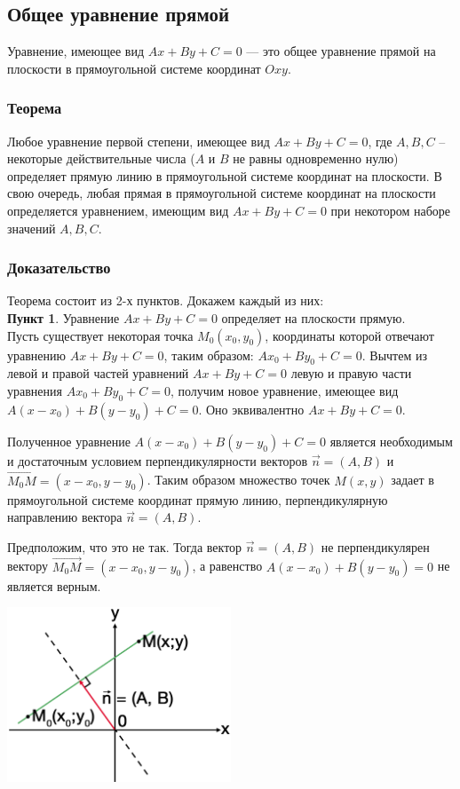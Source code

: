 \documentclass[a4paper,12pt]{extbook}
\theoremstyle{named}
\theoremstyle{named}
\begin{document}
\subsection*{Общее уравнение прямой}

Уравнение, имеющее вид \(Ax + By + C = 0\) — это общее уравнение прямой на плоскости в прямоугольной системе координат \(Oxy\).

\subsubsection*{Теорема}
Любое уравнение первой степени, имеющее вид \(Ax + By + C = 0\), где \(A, B, C\) – некоторые действительные числа (\(A\) и \(B\) не равны одновременно нулю) определяет прямую линию в прямоугольной системе координат на плоскости.
В свою очередь, любая прямая в прямоугольной системе координат на плоскости определяется уравнением, имеющим вид \(Ax + By + C = 0\) при некотором наборе значений \(A, B, C\).
\subsubsection*{Доказательство}
Теорема состоит из 2-х пунктов.
Докажем каждый из них: \\

\textbf{Пункт 1}. Уравнение \(Ax + By + C = 0\) определяет на плоскости прямую. \\

Пусть существует некоторая точка \(M_0(x_0, y_0)\), координаты которой отвечают уравнению \(Ax + By + C = 0\), таким образом: \(Ax_0 + By_0 + C = 0\).
Вычтем из левой и правой частей уравнений \(Ax + By + C = 0\) левую и правую части уравнения \(Ax_0 + By_0 + C = 0\), получим новое уравнение, имеющее вид \(A(x - x_0) + B(y - y_0) + C = 0\).
Оно эквивалентно \(Ax + By + C = 0\).

Полученное уравнение \(A(x - x_0) + B(y - y_0) + C = 0\) является необходимым и достаточным условием перпендикулярности векторов \(\overrightarrow{n} = (A, B)\) и \(\overrightarrow{M_0M} = (x - x_0, y - y_0)\).
Таким образом множество точек \(M(x, y)\) задает в прямоугольной системе координат прямую линию, перпендикулярную направлению вектора \(\overrightarrow{n} = (A, B)\).

Предположим, что это не так. Тогда вектор \(\overrightarrow{n} = (A, B)\) не перпендикулярен вектору \(\overrightarrow{M_0M} = (x - x_0, y - y_0)\), а равенство \(A(x - x_0) + B(y - y_0) = 0\) не является верным.

\begin{center}
    \includegraphics[width=0.5\textwidth]{general_line.png}
\end{center}
\end{document}
